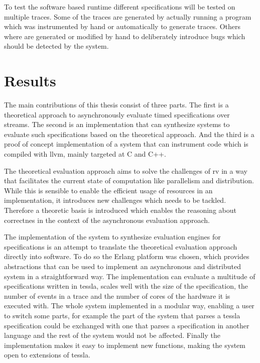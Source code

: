 To test the software based runtime different specifications will be tested on multiple traces.
Some of the traces are generated by actually running a program which was instrumented by hand or automatically to generate traces.
Others where are generated or modified by hand to deliberately introduce bugs which should be detected by the system.

\section{Results}
\label{sec:intro:results}

The main contributions of this thesis consist of three parts.
The first is a theoretical approach to asynchronously evaluate timed specifications over streams.
The second is an implementation that can synthesize systems to evaluate such specifications based on the theoretical approach.
And the third is a proof of concept implementation of a system that can instrument code which is compiled with \gls{llvm}, mainly targeted at C and C++.

The theoretical evaluation approach aims to solve the challenges of \gls{rv} in a way that facilitates the current state of computation like parallelism and distribution.
While this is sensible to enable the efficient usage of resources in an implementation, it introduces new challenges which needs to be tackled.
Therefore a theoretic basis is introduced which enables the reasoning about correctnes in the context of the asynchronous evaluation approach.

The implementation of the system to synthesize evaluation engines for specifications is an attempt to translate the theoretical evaluation approach directly into software.
To do so the Erlang platform was chosen, which provides abstractions that can be used to implement an asynchronous and distributed system in a straightforward way.
The implementation can evaluate a multitude of specifications written in \gls{tessla}, scales well with the size of the specification, the number of events in a trace and the number of cores of the hardware it is executed with.
The whole system implemented in a modular way, enabling a user to switch some parts, for example the part of the system that parses a \gls{tessla} specification could be exchanged with one that parses a specification in another language and the rest of the system would not be affected.
Finally the implementation makes it easy to implement new functions, making the system open to extensions of \gls{tessla}.

